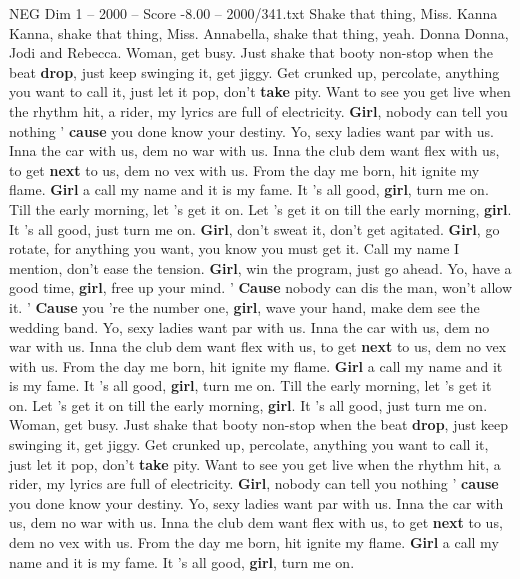 \begin{textsample}{NEG Dim 1 – 2000 – Score -8.00 – 2000/341.txt}  \label{ex:f1_neg_015}
Shake that thing, Miss.
Kanna Kanna, shake that thing, Miss.
Annabella, shake that thing, yeah.
Donna Donna, Jodi and Rebecca.
Woman, get busy.
Just shake that booty non-stop when the beat \textbf{drop}, just keep swinging it, get jiggy.
Get crunked up, percolate, anything you want to call it, just let it pop, don't \textbf{take} pity.
Want to see you get live when the rhythm hit, a rider, my lyrics are full of electricity. \textbf{Girl}, nobody can tell you nothing ' \textbf{cause} you done know your destiny.
Yo, sexy ladies want par with us.
Inna the car with us, dem no war with us.
Inna the club dem want flex with us, to get \textbf{next} to us, dem no vex with us.
From the day me born, hit ignite my flame. \textbf{Girl} a call my name and it is my fame.
It 's all good, \textbf{girl}, turn me on.
Till the early morning, let 's get it on.
Let 's get it on till the early morning, \textbf{girl}.
It 's all good, just turn me on. \textbf{Girl}, don't sweat it, don't get agitated. \textbf{Girl}, go rotate, for anything you want, you know you must get it.
Call my name I mention, don't ease the tension. \textbf{Girl}, win the program, just go ahead.
Yo, have a good time, \textbf{girl}, free up your mind. ' \textbf{Cause} nobody can dis the man, won't allow it. ' \textbf{Cause} you 're the number one, \textbf{girl}, wave your hand, make dem see the wedding band.
Yo, sexy ladies want par with us.
Inna the car with us, dem no war with us.
Inna the club dem want flex with us, to get \textbf{next} to us, dem no vex with us.
From the day me born, hit ignite my flame. \textbf{Girl} a call my name and it is my fame.
It 's all good, \textbf{girl}, turn me on.
Till the early morning, let 's get it on.
Let 's get it on till the early morning, \textbf{girl}.
It 's all good, just turn me on.
Woman, get busy.
Just shake that booty non-stop when the beat \textbf{drop}, just keep swinging it, get jiggy.
Get crunked up, percolate, anything you want to call it, just let it pop, don't \textbf{take} pity.
Want to see you get live when the rhythm hit, a rider, my lyrics are full of electricity. \textbf{Girl}, nobody can tell you nothing ' \textbf{cause} you done know your destiny.
Yo, sexy ladies want par with us.
Inna the car with us, dem no war with us.
Inna the club dem want flex with us, to get \textbf{next} to us, dem no vex with us.
From the day me born, hit ignite my flame. \textbf{Girl} a call my name and it is my fame.
It 's all good, \textbf{girl}, turn me on.

\end{textsample}
